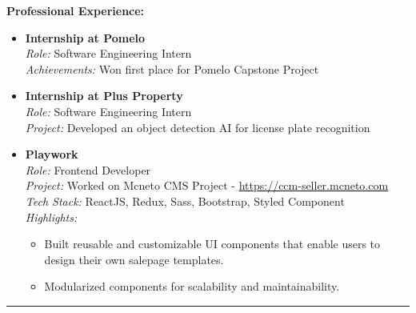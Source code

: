 \documentclass[a4paper,10pt]{article}
\begin{document}
\noindent
\textbf{Professional Experience:}
\begin{itemize}[leftmargin=0.5cm]
    \item \textbf{Internship at Pomelo} \\ \textit{Role:} Software Engineering Intern \\ \textit{Achievements:} Won first place for Pomelo Capstone Project

    \item \textbf{Internship at Plus Property} \\ \textit{Role:} Software Engineering Intern \\ \textit{Project:} Developed an object detection AI for license plate recognition

    \item \textbf{Playwork} \\
          \textit{Role:} Frontend Developer \\ 
          \textit{Project:} Worked on Mcneto CMS Project - \href{https://ccm-seller.mcneto.com/}{https://ccm-seller.mcneto.com} \\
          \textit{Tech Stack:} ReactJS, Redux, Sass, Bootstrap, Styled Component \\
          \textit{Highlights:}
          \begin{itemize}[leftmargin=0.5cm, noitemsep, topsep=0pt]
              \item Built reusable and customizable UI components that enable users to design their
                    own salepage templates.
              \item Modularized components for scalability and maintainability.
          \end{itemize}
\end{itemize}

\hrule
\vspace{0.3cm}
\end{document}
